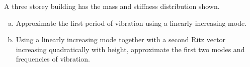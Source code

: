 
\begin{Exercise}[label={three_storey_helicopter}]
A three storey building has the mass and stiffness distribution shown.

\begin{enumerate}[(a)]
    \item Approximate the first period of vibration using a linearly increasing mode.
    \item Using a linearly increasing mode together with a second Ritz vector increasing quadratically with height, approximate the first two modes and frequencies of vibration.
\end{enumerate}    

\begin{center}
\end{center}
\shortAnswer
\end{Exercise}



